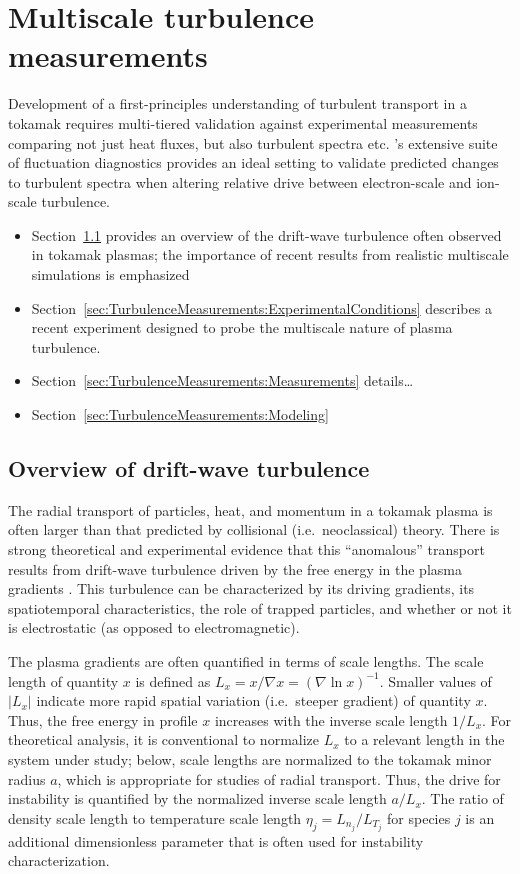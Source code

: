 \chapter{Multiscale turbulence measurements}
\label{ch:TurbulenceMeasurements}
Development of a first-principles understanding
of turbulent transport in a tokamak
requires multi-tiered validation against experimental measurements
comparing not just heat fluxes, but
also turbulent spectra etc.
\diiid's extensive suite of fluctuation diagnostics
provides an ideal setting to validate
predicted changes~\cite{howard_pp16}
to turbulent spectra when altering relative drive
between electron-scale and ion-scale turbulence.

\begin{itemize}
  \item Section~\ref{sec:TurbulenceMeasurements:Background}
    provides an overview of the drift-wave turbulence
    often observed in tokamak plasmas;
    the importance of recent results
    from realistic multiscale simulations is emphasized
  \item Section~\ref{sec:TurbulenceMeasurements:ExperimentalConditions}
    describes a recent \diiid\space experiment
    designed to probe the multiscale nature
    of plasma turbulence.
  \item Section~\ref{sec:TurbulenceMeasurements:Measurements}
    details\ldots
  \item Section~\ref{sec:TurbulenceMeasurements:Modeling}
\end{itemize}


\section{Overview of drift-wave turbulence}
\label{sec:TurbulenceMeasurements:Background}
The radial transport of particles, heat, and momentum in a tokamak plasma is
often larger than that predicted by collisional (i.e.\ neoclassical) theory.
There is strong theoretical and experimental evidence
that this ``anomalous'' transport
results from drift-wave turbulence
driven by the free energy in the plasma gradients
\cite{horton_drift_waves,tynan_ppcf09}.
This turbulence can be characterized by
its driving gradients,
its spatiotemporal characteristics,
the role of trapped particles, and
whether or not it is electrostatic
(as opposed to electromagnetic).

The plasma gradients are often quantified in terms of scale lengths.
The scale length of quantity $x$ is defined as
$L_x = x / \nabla x = (\nabla \ln x)^{-1}$.
Smaller values of $|L_x|$ indicate
more rapid spatial variation
(i.e.\ steeper gradient) of quantity $x$.
Thus, the free energy in profile $x$ increases with
the inverse scale length $1 / L_x$.
For theoretical analysis,
it is conventional to normalize $L_x$
to a relevant length in the system under study;
below, scale lengths are normalized
to the tokamak minor radius $a$,
which is appropriate for studies of radial transport.
Thus, the drive for instability is quantified
by the normalized inverse scale length $a / L_x$.
The ratio of density scale length to temperature scale length
$\eta_j = L_{n_j} / L_{T_j}$ for species $j$
is an additional dimensionless parameter
that is often used for instability characterization.

